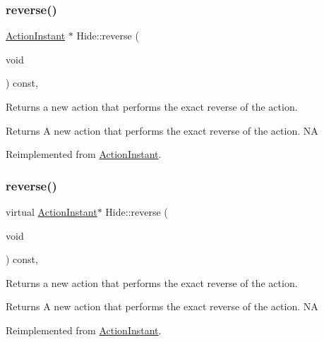 \subsubsection{\texorpdfstring{reverse()}{reverse()}\hspace{0.1cm}{\footnotesize\ttfamily [1/2]}}
{\footnotesize\ttfamily \hyperlink{classActionInstant}{Action\+Instant} $\ast$ Hide\+::reverse (\begin{DoxyParamCaption}\item[{void}]{ }\end{DoxyParamCaption}) const\hspace{0.3cm}{\ttfamily [override]}, {\ttfamily [virtual]}}

Returns a new action that performs the exact reverse of the action.

\begin{DoxyReturn}{Returns}
A new action that performs the exact reverse of the action.  NA 
\end{DoxyReturn}


Reimplemented from \hyperlink{classActionInstant_aeb1870802c509e1f4111c863a28e9262}{Action\+Instant}.

\mbox{\label{classHide_aed88024d6c8fc718c8e45307a158b913}} 
\subsubsection{\texorpdfstring{reverse()}{reverse()}\hspace{0.1cm}{\footnotesize\ttfamily [2/2]}}
{\footnotesize\ttfamily virtual \hyperlink{classActionInstant}{Action\+Instant}$\ast$ Hide\+::reverse (\begin{DoxyParamCaption}\item[{void}]{ }\end{DoxyParamCaption}) const\hspace{0.3cm}{\ttfamily [override]}, {\ttfamily [virtual]}}

Returns a new action that performs the exact reverse of the action.

\begin{DoxyReturn}{Returns}
A new action that performs the exact reverse of the action.  NA 
\end{DoxyReturn}


Reimplemented from \hyperlink{classActionInstant_aeb1870802c509e1f4111c863a28e9262}{Action\+Instant}.

